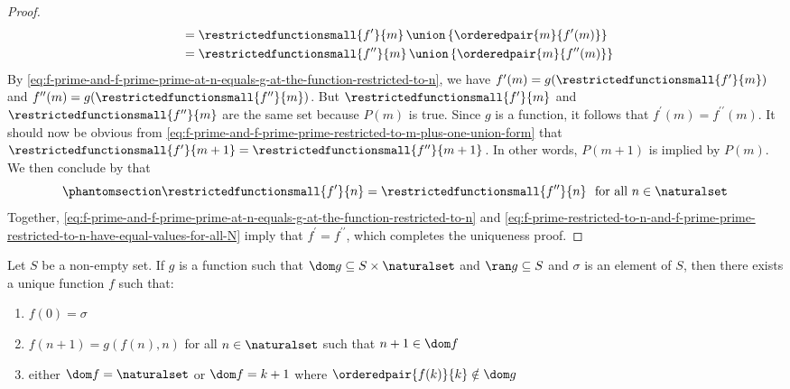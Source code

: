 \begin{proof}
\begin{equation}
\begin{aligned}
        \end{aligned}
        \begin{aligned}
            &\ = \restrictedfunctionsmall{f^{\prime}}{m} \,{\union}\, \mleft\{ \orderedpair{m}{f^{\prime}(m)} \mright\}\\
            &\ = \restrictedfunctionsmall{f^{\prime\prime}}{m} \,{\union}\, \mleft\{ \orderedpair{m}{f^{\prime\prime}(m)} \mright\}\\
        \end{aligned}
    \end{equation}
    By \eqref{eq:f-prime-and-f-prime-prime-at-n-equals-g-at-the-function-restricted-to-n}, we have
    \( f^{\prime}(m) = g( \restrictedfunctionsmall{f^{\prime}}{m} ) \) and
    \( f^{\prime\prime}(m) = g( \restrictedfunctionsmall{f^{\prime\prime}}{m} )\).
    But \( \restrictedfunctionsmall{f^{\prime}}{m}  \) and \( \restrictedfunctionsmall{f^{\prime\prime}}{m} \) are the same set
    because \( P(m) \) is true. Since \( g \) is a function, it follows that \( f^{\prime}(m) = f^{\prime\prime}(m) \).
    It should now be obvious from \eqref{eq:f-prime-and-f-prime-prime-restricted-to-m-plus-one-union-form} that
    \( \restrictedfunctionsmall{f^{\prime}}{m + 1} = \restrictedfunctionsmall{f^{\prime\prime}}{m + 1} \).
    In other words, \( P(m + 1) \) is implied by \( P(m) \).
    We then conclude by  that
    \begin{equation}
        \phantomsection \label{eq:f-prime-restricted-to-n-and-f-prime-prime-restricted-to-n-have-equal-values-for-all-N}
        \restrictedfunctionsmall{f^{\prime}}{n} = \restrictedfunctionsmall{f^{\prime\prime}}{n} \ \ \text{for all \( n \in \naturalset \)}
    \end{equation}
    Together, \eqref{eq:f-prime-and-f-prime-prime-at-n-equals-g-at-the-function-restricted-to-n}
    and \eqref{eq:f-prime-restricted-to-n-and-f-prime-prime-restricted-to-n-have-equal-values-for-all-N}
    imply that \( f^{\prime} = f^{\prime\prime} \), which completes the uniqueness proof.
\end{proof}

\begin{recursion-theorem}
     \label{recursion-theorem:generalized-standard-form}
    Let \( S \) be a non-empty set.
    If \( g \) is a function such that \( \dom g \subseteq  S \times \naturalset \) and \( \ran g \subseteq  S \) and \( \sigma \) is an element of \( S \), then
    there exists a unique function \( f \) such that:
    \begin{enumerate}[topsep=2pt,label=\textup{\texttt{(\alph*)}}]
        \item \( f(0) = \sigma \)
        \item \( f(n + 1) = g(f(n), n) \) for all \( n \in \naturalset \) such that \( n + 1 \in \dom f \)
        \item either \( \dom f = \naturalset \) or \( \dom f = k + 1 \) where \( \orderedpair{f(k)}{k} \notin \dom g \)
    \end{enumerate}
\end{recursion-theorem}

